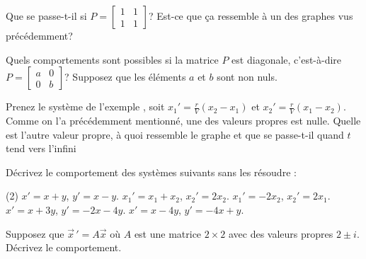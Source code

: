 \begin{exercise}
Que se passe-t-il si $P = 
\left[ \begin{smallmatrix} 1 & 1 \\ 1 & 1 \end{smallmatrix} \right]$?
Est-ce que ça ressemble à un des graphes vus précédemment?
\end{exercise}

\begin{exercise}
Quels comportements sont possibles si la matrice $P$ est diagonale, c’est-à-dire
$P = \left[ \begin{smallmatrix} a & 0 \\ 0 & b \end{smallmatrix} \right]$?
Supposez que les éléments $a$ et $b$ sont non nuls.
\end{exercise}

\begin{exercise}
Prenez le système de l’exemple , soit
$x_1'=\frac{r}{V}(x_2-x_1)$ et
$x_2'=\frac{r}{V}(x_1-x_2)$.
Comme on l'a précédemment mentionné, une des valeurs propres est nulle. Quelle est l'autre valeur propre, à quoi ressemble le graphe et que se passe-t-il quand $t$ tend vers l’infini\end{exercise}

\setcounter{exercise}{100}

\begin{exercise}
Décrivez le comportement des systèmes suivants sans les résoudre :
\begin{tasks}(2)
\task $x' = x + y$, \quad $y' = x-y$.
\task $x_1' = x_1 + x_2$, \quad $x_2' = 2 x_2$.
\task $x_1' = -2x_2$, \quad $x_2' = 2 x_1$.
\task $x' = x + 3y$, \quad $y' = -2x-4y$.
\task $x' = x - 4y$, \quad $y' = -4x+y$.
\end{tasks}
\end{exercise}

\begin{exercise}
Supposez que $\vec{x}\,' = A \vec{x}$ où $A$ est une matrice $2 \times 2$ avec des valeurs propres  $2\pm i$.  Décrivez le comportement.
\end{exercise}

